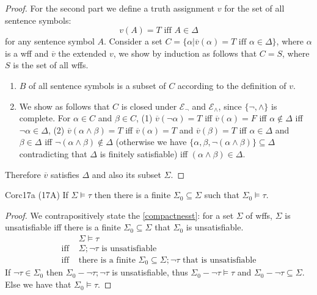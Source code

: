 \begin{proof}
  For the second part we define a truth assignment $v$ for the set of all sentence symbols:
  \[
    v(A)=T\text{ iff }A\in \Delta
  \]
  for any sentence symbol $A$. Consider a set $C=\{\alpha|\overline{v}(\alpha)=T\text{ iff }\alpha\in \Delta\}$, where $\alpha$ is a wff and $\overline{v}$ the extended $v$, we show by induction as follows that $C=S$, where $S$ is the set of all wffs.
  \begin{enumerate}
    \item $B$ of all sentence symbols is a subset of $C$ according to the definition of $v$.
    \item We show as follows that $C$ is closed under $\mathcal{E}_{\neg}$ and $\mathcal{E}_{\wedge}$, since $\{\neg,\wedge\}$ is complete. For $\alpha\in C$ and $\beta\in C$, (1) $\overline{v}(\neg\alpha)=T$ iff $\overline{v}(\alpha)=F$ iff $\alpha\notin \Delta$ iff $\neg \alpha\in \Delta$, (2) $\overline{v}(\alpha\wedge \beta)=T$ iff $\overline{v}(\alpha)=T$ and $\overline{v}(\beta)=T$ iff $\alpha\in \Delta$ and $\beta\in \Delta$ iff $\neg(\alpha\wedge \beta)\notin \Delta$ (otherwise we have $\{\alpha,\beta,\neg(\alpha\wedge \beta)\}\subseteq \Delta$ contradicting that $\Delta$ is finitely satisfiable) iff $(\alpha\wedge\beta)\in \Delta$.
  \end{enumerate}
  Therefore $\overline{v}$ satisfies $\Delta$ and also its subset $\Sigma$.
\end{proof}

\begin{reference}{Cor}{c17a}
  (17A) If $\Sigma\vDash \tau$ then there is a finite $\Sigma_0\subseteq \Sigma$ such that $\Sigma_0\vDash \tau$.
\end{reference}

\begin{proof}
  We contrapositively state the \ref{compactnesst}: for a set $\Sigma$ of wffs, $\Sigma$ is unsatisfiable iff there is a finite $\Sigma_0\subseteq \Sigma$ that $\Sigma_0$ is unsatisfiable.
  \begin{align*}
                & \Sigma\vDash \tau                                                                        \\
    \text{iff } & \Sigma;\neg \tau \text{ is unsatisfiable}                                                \\
    \text{iff } & \text{there is a finite }\Sigma_0\subseteq \Sigma;\neg\tau \text{ that is unsatisfiable}
  \end{align*}
  If $\neg\tau\in \Sigma_0$ then $\Sigma_0-\neg\tau;\neg\tau$ is unsatisfiable, thus $\Sigma_0-\neg\tau\vDash \tau$ and $\Sigma_0-\neg\tau\subseteq \Sigma$. Else we have that $\Sigma_0\vDash \tau$.
\end{proof}

